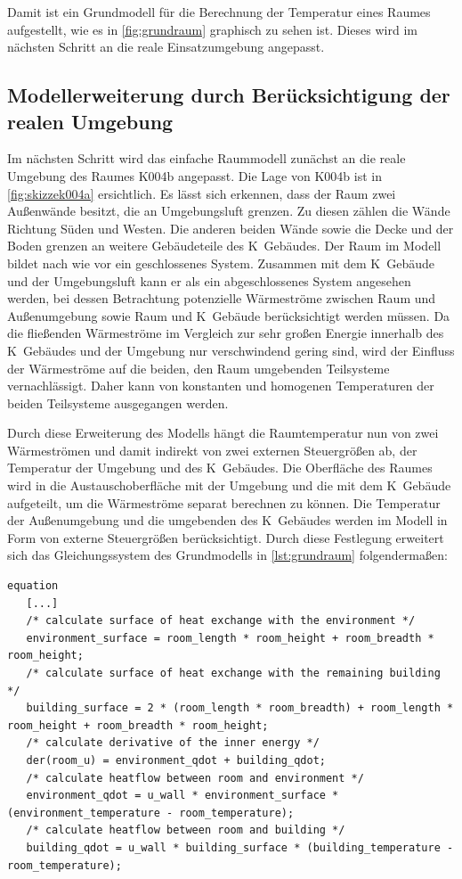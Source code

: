Damit ist ein Grundmodell für die Berechnung der Temperatur eines Raumes aufgestellt, wie es in \ref{fig:grundraum} graphisch zu sehen ist. Dieses wird im nächsten Schritt an die reale Einsatzumgebung angepasst.


\subsection{Modellerweiterung durch Berücksichtigung der realen Umgebung}

Im nächsten Schritt wird das einfache Raummodell zunächst an die reale Umgebung des Raumes K004b angepasst. Die Lage von K004b ist in \ref{fig:skizzek004a} ersichtlich. Es lässt sich erkennen, dass der Raum zwei Außenwände besitzt, die an Umgebungsluft grenzen. Zu diesen zählen die Wände Richtung Süden und Westen. Die anderen beiden Wände sowie die Decke und der Boden grenzen an weitere Gebäudeteile des K~Gebäudes. Der Raum im Modell bildet nach wie vor ein geschlossenes System. Zusammen mit dem K~Gebäude und der Umgebungsluft kann er als ein abgeschlossenes System angesehen werden, bei dessen Betrachtung potenzielle Wärmeströme zwischen Raum und Außenumgebung sowie Raum und K~Gebäude berücksichtigt werden müssen. Da die fließenden Wärmeströme im Vergleich zur sehr großen Energie innerhalb des K~Gebäudes und der Umgebung nur verschwindend gering sind, wird der Einfluss der Wärmeströme auf die beiden, den Raum umgebenden Teilsysteme vernachlässigt. Daher kann von konstanten und homogenen Temperaturen der beiden Teilsysteme ausgegangen werden.

Durch diese Erweiterung des Modells hängt die Raumtemperatur nun von zwei Wärmeströmen und damit indirekt von zwei externen Steuergrößen ab, der Temperatur der Umgebung und des K~Gebäudes. Die Oberfläche des Raumes wird in die Austauschoberfläche mit der Umgebung und die mit dem K~Gebäude aufgeteilt, um die Wärmeströme separat berechnen zu können. Die Temperatur der Außenumgebung und die umgebenden des K~Gebäudes werden im Modell in Form von externe Steuergrößen berücksichtigt. Durch diese Festlegung erweitert sich das Gleichungssystem des Grundmodells in \ref{lst:grundraum} folgendermaßen:
\begin{lstlisting}[language=Modelica, caption={Erweitertes Gleichungssystem Modell des Raumes unter Berücksichtigung der realen Umgebung in Modelica}, label=lst:raumeins]
equation
   [...]
   /* calculate surface of heat exchange with the environment */
   environment_surface = room_length * room_height + room_breadth * room_height;
   /* calculate surface of heat exchange with the remaining building */
   building_surface = 2 * (room_length * room_breadth) + room_length * room_height + room_breadth * room_height;
   /* calculate derivative of the inner energy */
   der(room_u) = environment_qdot + building_qdot;
   /* calculate heatflow between room and environment */
   environment_qdot = u_wall * environment_surface * (environment_temperature - room_temperature);
   /* calculate heatflow between room and building */
   building_qdot = u_wall * building_surface * (building_temperature - room_temperature);
\end{lstlisting}

